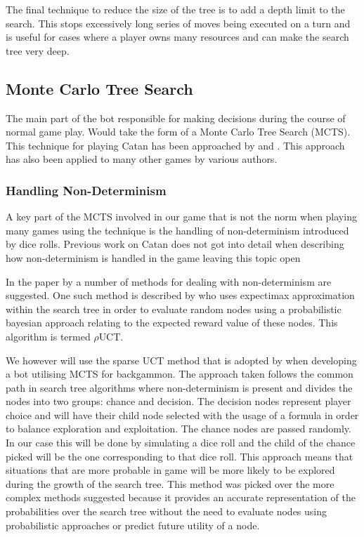 \documentclass[]{article}
\begin{document}
\par The final technique to reduce the size of the tree is to add a depth limit to the search. This stops excessively long series of moves being executed on a turn and is useful for cases where a player owns many resources and can make the search tree very deep. 



\subsection{Monte Carlo Tree Search}
The main part of the bot responsible for making decisions during the course of normal game play. Would take the form of a Monte Carlo Tree Search (MCTS). This technique for playing Catan has been approached by \textcite{szita2009monte} and \textcite{roelofs2012monte}. This approach has also been applied to many other games by various authors.



\subsubsection{Handling Non-Determinism}
A key part of the MCTS involved in our game that is not the norm when playing many games using the technique is the handling of non-determinism introduced by dice rolls. Previous work on Catan does not got into detail when describing how non-determinism is handled in the game leaving this topic open 

\par In the paper by \textcite{browne2012survey} a number of methods for dealing with non-determinism are suggested. One such method is described by \textcite{veness2011monte} who uses expectimax approximation within the search tree in order to evaluate random nodes using a probabilistic bayesian approach relating to the expected reward value of these nodes. This algorithm is termed $\rho$UCT.

\par We however will use the sparse UCT method \textcite{bjarnason2009lower} that is adopted by \textcite{van2007monte} when developing a bot utilising MCTS for backgammon. The approach taken follows the common path in search tree algorithms where non-determinism is present and divides the nodes into two groups: chance and decision. The decision nodes represent player choice and will have their child node selected with the usage of a formula in order to balance exploration and exploitation. The chance nodes are passed randomly. In our case this will be done by simulating a dice roll and the child of the chance picked will be the one corresponding to that dice roll. This approach means that situations that are more probable in game will be more likely to be explored during the growth of the search tree. This method was picked over the more complex methods suggested because it provides an accurate representation of the probabilities over the search tree without the need to evaluate nodes using probabilistic approaches or predict future utility of a node.
\end{document}
